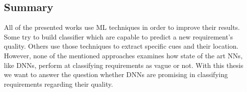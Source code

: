 \subsection{Summary}
All of the presented works use \ac{ML} techniques in order to improve their results.
Some try to build classifier which are capable to predict a new requirement's quality.
Others use those techniques to extract specific cues and their location.
However, none of the mentioned approaches examines how state of the art \acp{NN}, like \acp{DNN}, perform at classifying requirements as vague or not.
With this thesis we want to answer the question whether \acp{DNN} are promising in classifying requirements regarding their quality.
